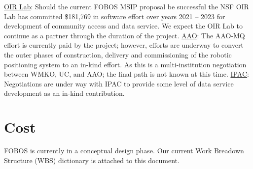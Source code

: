\documentclass[oneside,11pt]{amsart}
\begin{document}
\underline{OIR Lab}: Should the current FOBOS MSIP proposal be
successful the NSF OIR Lab has committed \$181,769 in software effort
over years 2021 – 2023 for development of community access and data
service. We expect the OIR Lab to continue as a partner through the
duration of the project. \underline{AAO}: The AAO-MQ effort is
currently paid by the project; however, efforts are underway to
convert the outer phases of construction, delivery and commissioning
of the robotic positioning system to an in-kind effort. As this is a
multi-institution negotiation between WMKO, UC, and AAO; the final
path is not known at this time. \underline{IPAC}: Negotiations are
under way with IPAC to provide some level of data service development
as an in-kind contribution.


\section{Cost}
\label{sec:cost}






FOBOS is currently in a conceptual design phase. Our current Work
Breadown Structure (WBS) dictionary is attached to this document.
\end{document}
